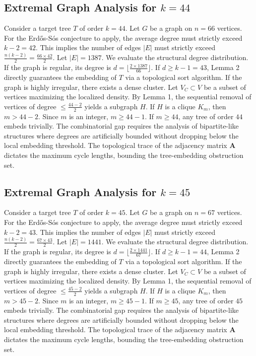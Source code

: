 \documentclass[11pt,a4paper]{article}
\begin{document}
\subsection{Extremal Graph Analysis for $k=44$}
Consider a target tree $T$ of order $k=44$.
Let $G$ be a graph on $n=66$ vertices.
For the Erd\H{o}s-S\'os conjecture to apply, the average degree must strictly exceed $k-2 = 42$.
This implies the number of edges $|E|$ must strictly exceed $\frac{n(k-2)}{2} = \frac{66 \times 42}{2}$.
Let $|E| = 1387$.
We evaluate the structural degree distribution. If the graph is regular, its degree is $d = \lfloor \frac{2 \times 1387}{66} \rfloor$.
If $d \geq k-1 = 43$, Lemma 2 directly guarantees the embedding of $T$ via a topological sort algorithm.
If the graph is highly irregular, there exists a dense cluster. Let $V_C \subset V$ be a subset of vertices maximizing the localized density.
By Lemma 1, the sequential removal of vertices of degree $\leq \frac{44-2}{2}$ yields a subgraph $H$.
If $H$ is a clique $K_{m}$, then $m > 44-2$. Since $m$ is an integer, $m \geq 44-1$. If $m \geq 44$, any tree of order $44$ embeds trivially.
The combinatorial gap requires the analysis of bipartite-like structures where degrees are artificially bounded without dropping below the local embedding threshold. The topological trace of the adjacency matrix $\mathbf{A}$ dictates the maximum cycle lengths, bounding the tree-embedding obstruction set.


\subsection{Extremal Graph Analysis for $k=45$}
Consider a target tree $T$ of order $k=45$.
Let $G$ be a graph on $n=67$ vertices.
For the Erd\H{o}s-S\'os conjecture to apply, the average degree must strictly exceed $k-2 = 43$.
This implies the number of edges $|E|$ must strictly exceed $\frac{n(k-2)}{2} = \frac{67 \times 43}{2}$.
Let $|E| = 1441$.
We evaluate the structural degree distribution. If the graph is regular, its degree is $d = \lfloor \frac{2 \times 1441}{67} \rfloor$.
If $d \geq k-1 = 44$, Lemma 2 directly guarantees the embedding of $T$ via a topological sort algorithm.
If the graph is highly irregular, there exists a dense cluster. Let $V_C \subset V$ be a subset of vertices maximizing the localized density.
By Lemma 1, the sequential removal of vertices of degree $\leq \frac{45-2}{2}$ yields a subgraph $H$.
If $H$ is a clique $K_{m}$, then $m > 45-2$. Since $m$ is an integer, $m \geq 45-1$. If $m \geq 45$, any tree of order $45$ embeds trivially.
The combinatorial gap requires the analysis of bipartite-like structures where degrees are artificially bounded without dropping below the local embedding threshold. The topological trace of the adjacency matrix $\mathbf{A}$ dictates the maximum cycle lengths, bounding the tree-embedding obstruction set.
\end{document}
